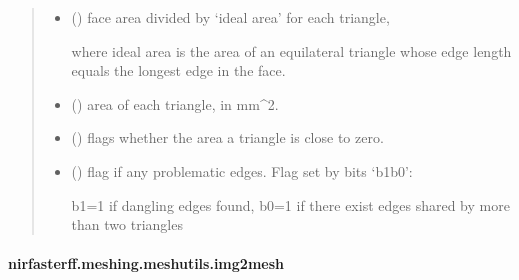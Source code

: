 \documentclass[letterpaper,10pt,english]{sphinxmanual}
\begin{document}
\begin{fulllineitems}
\begin{quote}
\begin{description}
\begin{itemize}
\item {} 
\sphinxAtStartPar
{} () \textendash{} face area divided by ‘ideal area’ for each triangle,

\sphinxAtStartPar
where ideal area is the area of an equilateral triangle whose edge length equals the longest edge in the face.

\item {} 
\sphinxAtStartPar
{} () \textendash{} area of each triangle, in mm\textasciicircum{}2.

\item {} 
\sphinxAtStartPar
{} () \textendash{} flags whether the area a triangle is close to zero.

\item {} 
\sphinxAtStartPar
{} () \textendash{} flag if any problematic edges. Flag set by bits ‘b1b0’:

\sphinxAtStartPar
b1=1 if dangling edges found, b0=1 if there exist edges shared by more than two triangles

\end{itemize}


\end{description}\end{quote}

\end{fulllineitems}


\sphinxstepscope


\paragraph{nirfasterff.meshing.meshutils.img2mesh}
\label{\detokenize{_autosummary/nirfasterff.meshing.meshutils.img2mesh:nirfasterff-meshing-meshutils-img2mesh}}\label{\detokenize{_autosummary/nirfasterff.meshing.meshutils.img2mesh::doc}}
\end{document}
